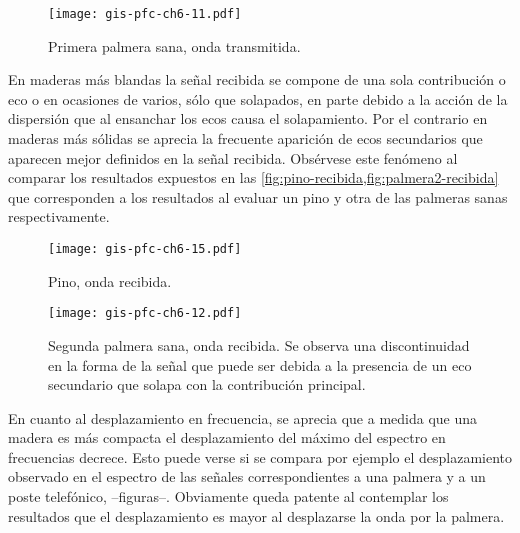 \begin{figure}
    \begin{center}
	\texttt{[image: gis-pfc-ch6-11.pdf]}
    \end{center}
    \caption[Primera palmera sana (onda transmitida)]{Primera palmera sana,
    onda transmitida.}
    \label{fig:palmera1-transmitida}
\end{figure}

\clearpage

En maderas más blandas la señal recibida se compone de una sola
contribución o eco o en ocasiones de varios, sólo que solapados, en parte
debido a la acción de la dispersión que al ensanchar los ecos causa el
solapamiento. Por el contrario en maderas más sólidas se aprecia la
frecuente aparición de ecos secundarios que aparecen mejor definidos en la
señal recibida. Obsérvese este fenómeno al comparar los resultados
expuestos en las \cref{fig:pino-recibida,fig:palmera2-recibida} que
corresponden a los resultados al evaluar un pino y otra de las palmeras
sanas respectivamente.

\begin{figure}
    \begin{center}
	\texttt{[image: gis-pfc-ch6-15.pdf]}
    \end{center}
    \caption[Pino (onda recibida)]{Pino, onda recibida.}
    \label{fig:pino-recibida}
\end{figure}

\begin{figure}
    \begin{center}
	\texttt{[image: gis-pfc-ch6-12.pdf]}
    \end{center}
    \caption[Segunda palmera sana (onda recibida)]{Segunda palmera sana,
    onda recibida. Se observa una discontinuidad en la forma de la señal
    que puede ser debida a la presencia de un eco secundario que solapa con
    la contribución principal.}
    \label{fig:palmera2-recibida}
\end{figure}

\clearpage

En cuanto al desplazamiento en frecuencia, se aprecia que a medida que una
madera es más compacta el desplazamiento del máximo del espectro en
frecuencias decrece. Esto puede verse si se compara por ejemplo el
desplazamiento observado en el espectro de las señales correspondientes a
una palmera y a un poste telefónico,  --figuras--. Obviamente queda patente
al contemplar los resultados que el desplazamiento es mayor al desplazarse
la onda por la palmera.

